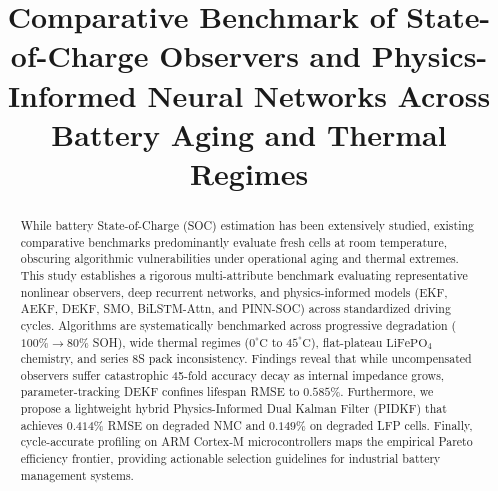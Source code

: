 \documentclass[balance,nocopyright,upint,varvw,hyphenate,barcolor=NavyBlue,nolists]{asmejour}
\begin{document}


\title{Comparative Benchmark of State-of-Charge Observers and Physics-Informed Neural Networks Across Battery Aging and Thermal Regimes}


\begin{abstract}
While battery State-of-Charge (SOC) estimation has been extensively studied, existing comparative benchmarks predominantly evaluate fresh cells at room temperature, obscuring algorithmic vulnerabilities under operational aging and thermal extremes. This study establishes a rigorous multi-attribute benchmark evaluating representative nonlinear observers, deep recurrent networks, and physics-informed models (EKF, AEKF, DEKF, SMO, BiLSTM-Attn, and PINN-SOC) across standardized driving cycles. Algorithms are systematically benchmarked across progressive degradation ($100\% \rightarrow 80\%$ SOH), wide thermal regimes ($0^\circ\text{C}$ to $45^\circ\text{C}$), flat-plateau $\text{LiFePO}_4$ chemistry, and series 8S pack inconsistency. Findings reveal that while uncompensated observers suffer catastrophic 45-fold accuracy decay as internal impedance grows, parameter-tracking DEKF confines lifespan RMSE to $0.585\%$. Furthermore, we propose a lightweight hybrid Physics-Informed Dual Kalman Filter (PIDKF) that achieves $0.414\%$ RMSE on degraded NMC and $0.149\%$ on degraded LFP cells. Finally, cycle-accurate profiling on ARM Cortex-M microcontrollers maps the empirical Pareto efficiency frontier, providing actionable selection guidelines for industrial battery management systems.
\end{abstract}
\end{document}
